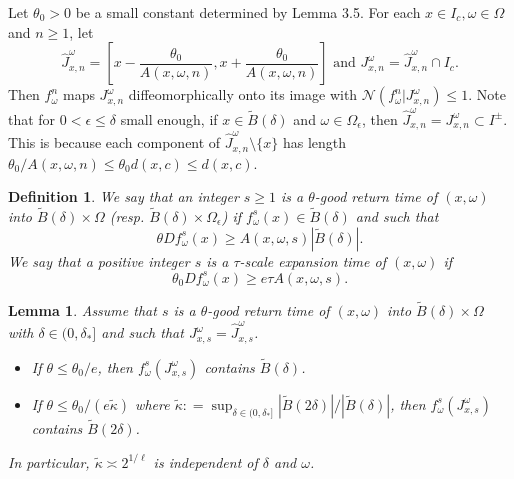 \documentclass[11pt,oneside]{article}
\newtheorem{definition}{Definition}[section]
\theoremstyle{plain}
\newtheorem{lem}{Lemma}[section]
\numberwithin{equation}{section}
\numberwithin{figure}{section}
\numberwithin{table}{section}
\begin{document}
Let $\theta_0 > 0$ be a small constant determined by Lemma 3.5. For each $x \in I_c, \omega \in \Omega$ and $n \geq 1$, let  
\begin{equation}
\hat J^{\omega}_{x, n} = \left[ x - \frac{\theta_0}{A(x, \omega, n)},  x + \frac{\theta_0}{A(x, \omega, n)} \right] \text{ and } J^{\omega}_{x, n} = \hat J^{\omega}_{x, n} \cap I_c. 
\end{equation}
Then $f_{\omega}^n$ maps $J^{\omega}_{x, n}$ diffeomorphically onto its image with $\mathcal N(f_{\omega}^n | J^{\omega}_{x, n}) \leq 1$. Note that for $0 < \epsilon \leq \delta$ small enough, if $x \in \tilde B(\delta)$ and $\omega \in \Omega_{\epsilon}$, then $\hat J^{\omega}_{x, n} = J^{\omega}_{x, n} \subset I^{\pm}$. This is because each component of $\hat J^{\omega}_{x, n} \setminus \{ x \}$ has length $\theta_0/A(x, \omega, n) \leq \theta_0 d(x, c) \leq d(x, c)$.



\begin{definition}
We say that an integer $s \geq 1$ is a $\theta$-good return time of $(x, \omega)$ into $\tilde B(\delta) \times \Omega$ (resp. $\tilde B(\delta) \times \Omega_{\epsilon}$) if $f_{\omega}^s (x) \in \tilde B(\delta)$ and such that 
\begin{equation}
\theta Df_{\omega}^s (x) \geq A(x, \omega, s) |\tilde B(\delta)|. 
\end{equation}
We say that a positive integer $s$ is a {\it $\tau$-scale expansion time of $(x, \omega)$} if
\[
\theta_0 Df_{\omega}^s (x) \geq e \tau A(x, \omega, s).
\]
\end{definition}


\begin{lem}


Assume that $s$ is a $\theta$-good return time of $(x, \omega)$ into $\tilde B(\delta) \times \Omega$ with $ \delta \in (0,  \delta_{*}]$ and such that $J_{x, s}^{\omega} = \hat J_{x, s}^{\omega}$.  
\begin{itemize}
\item[(1)] If $\theta \leq \theta_0 /e$, then $f_{\omega}^s (J^{\omega}_{x, s})$ contains $\tilde B(\delta)$.

\item[(2)] If $\theta \leq \theta_0 /(e\tilde \kappa)$ where $\tilde \kappa : = \sup_{\delta \in (0, \delta_*]} |\tilde B(2 \delta)|/ |\tilde B(\delta)|$, then $f_{\omega}^s (J^{\omega}_{x, s})$ contains $\tilde B(2\delta)$.
\end{itemize}
In particular, $\tilde \kappa \asymp 2^{1/\ell} $ is independent of $\delta$ and $\omega$. 
\end{lem}
\end{document}
